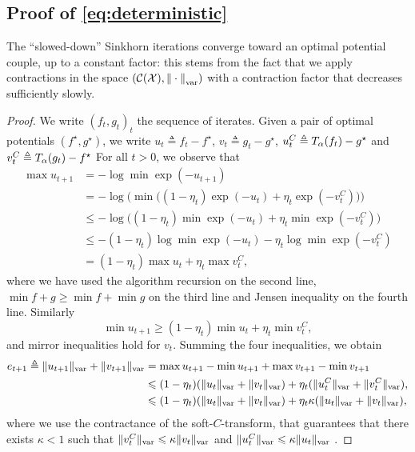 \subsection{Proof of \autoref{eq:deterministic}}

The \enquote{slowed-down} Sinkhorn iterations converge toward an optimal
potential couple, up to a constant factor: this stems from the fact that we
apply contractions in the space $(\mathcal{C}(\mathcal{X}), {\Vert\cdot\Vert}_{\text{\upshape var}})$ with a
contraction factor that decreases sufficiently slowly.

\begin{proof}
    We write ${(f_t, g_t)}_t$ the sequence of iterates. Given a pair of optimal potentials 
    $(f^\star, g^\star)$, we write $u_t \triangleq f_t - f^\star$, $v_t \triangleq g_t - g^\star$,
    $u_t^C \triangleq T_{\alpha}(f_t) - g^\star$ and $v_t^C \triangleq T_{\alpha}(g_t) - f^\star$
    For all $t > 0$, we observe that 
    \begin{align}
        \max u_{t+1} &= - \log \min \exp(-u_{t+1}) \\
        &= - \log \big( \min \big( (1 - \eta_t) \exp(-u_{t}) + \eta_t 
        \exp(-v_t^C) \big) \big)\\
        &\leq - \log \big( (1 - \eta_t) \min \exp(-u_{t}) + \eta_t 
        \min \exp(-v_t^C) \big)\\
        &\leq - (1 - \eta_t) \log \min \exp(-u_{t}) -  \eta_t \log \min
         \exp(-v_t^C) \\
         &= (1 - \eta_t) \max u_t  + \eta_t \max v_t^C,
    \end{align}
    where we have used the algorithm recursion on the second line, $\min f + g \geq \min f + \min g$
     on the third line and Jensen inequality on the fourth line. Similarly
    \begin{equation}
        \min u_{t+1} \geq (1 - \eta_t) \min u_t  + \eta_t \min v_t^C,
    \end{equation}
    and mirror inequalities hold for $v_t$. Summing the four inequalities, we obtain
    \begin{align}\label{eq:et}
        e_{t+1} \triangleq \Vert u_{t+1} \Vert_{\text{\upshape var}} + \Vert v_{t+1} \Vert_{\text{\upshape var}} 
        &= \max u_{t+1} - \min u_{t+1} + \max v_{t+1} - \min v_{t+1} \\
        &\leqslant
        (1 - \eta_t) ( \Vert u_t \Vert_{\text{\upshape var}} + \Vert v_t \Vert_{\text{\upshape var}})
        + \eta_t ( \Vert u_t^C \Vert_{\text{\upshape var}} + \Vert v_t^C \Vert_{\text{\upshape var}}), \\
        &\leqslant
        (1 - \eta_t) ( \Vert u_t \Vert_{\text{\upshape var}} + \Vert v_t \Vert_{\text{\upshape var}})
        + \eta_t \kappa ( \Vert u_t \Vert_{\text{\upshape var}} + \Vert v_t \Vert_{\text{\upshape var}}),
    \end{align}
    where we use the contractance of the soft-$C$-transform, that guarantees that
    there exists $\kappa < 1$ such that $\Vert v_t^C\Vert_{\text{\upshape var}} \leqslant \kappa \Vert
    v_t\Vert_{\text{\upshape var}}$ and $\Vert u_t^C\Vert_{\text{\upshape var}} \leqslant \kappa \Vert
    u_t\Vert_{\text{\upshape var}}$ \citep{peyre2019computational}.


\end{proof}
